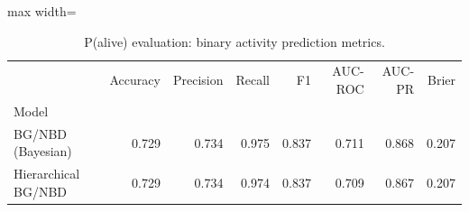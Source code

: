 \begin{table}[htbp]
\centering
\caption{P(alive) evaluation: binary activity prediction metrics.}
\label{tab:p_alive}
\begin{adjustbox}{max width=\linewidth}
\begin{tabular}{lrrrrrrr}
\toprule
 & Accuracy & Precision & Recall & F1 & AUC-ROC & AUC-PR & Brier \\
Model &  &  &  &  &  &  &  \\
\midrule
BG/NBD (Bayesian) & 0.729 & 0.734 & 0.975 & 0.837 & 0.711 & 0.868 & 0.207 \\
Hierarchical BG/NBD & 0.729 & 0.734 & 0.974 & 0.837 & 0.709 & 0.867 & 0.207 \\
\bottomrule
\end{tabular}
\end{adjustbox}
\end{table}
